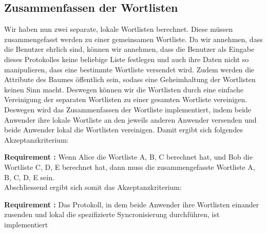 \documentclass{article}
\newcounter{requirementscount}{}
\newcommand{\requirement}[1] {
        \addtocounter{requirementscount}{1}
        {\bf Requirement \therequirementscount:} #1\\
    }
\begin{document}
\subsection{Zusammenfassen der Wortlisten}
Wir haben nun zwei separate, lokale Wortlisten berechnet. Diese m\"ussen
zusammengefasst werden zu einer gemeinsamen Wortliste. Da wir annehmen, dass
die Benutzer ehrlich sind, k\"onnen wir annehmen, dass die Benutzer als
Eingabe dieses Protokolles keine beliebige Liste festlegen und auch ihre
Daten nicht so manipulieren, dass eine bestimmte Wortliste versendet wird.
Zudem werden die Attribute des Baumes \"offentlich sein, sodass eine
Geheimhaltung der Wortlisten keinen Sinn macht.
Deswegen k\"onnen wir die Wortlisten durch eine einfache Vereinigung der
separaten Wortlisten zu einer gesamten Wortliste vereinigen. Deswegen wird 
das Zusammenfassen der Wortliste implementiert, indem beide Anwender ihre
lokale Wortliste an den jeweils anderen Anwender versenden und beide 
Anwender lokal die Wortlisten vereinigen. Damit ergibt sich folgendes
Akzeptanzkriterium:\\
\requirement{Wenn Alice die Wortliste A, B, C berechnet hat, und Bob die
Wortliste C, D, E berechnet hat, dann muss die zusammengefasste Wortliste
A, B, C, D, E sein.} 

Abschliessend ergibt sich somit das Akzeptanzkriterium:\\
\requirement{Das Protokoll, in dem beide Anwender ihre Wortlisten einander
zusenden und lokal die spezifizierte Syncronisierung durchf\"uhren, ist
implementiert}

\pagebreak %
\end{document}
